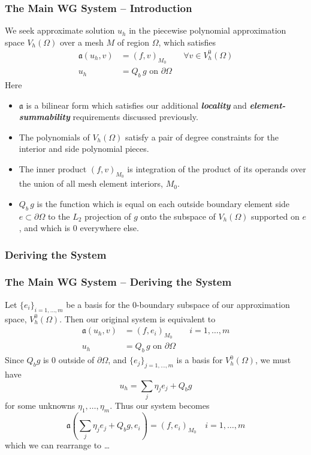 \documentclass[compress]{beamer}
\begin{document}
\begin{frame}
  \frametitle{The Main WG System -- Introduction}
    We seek approximate solution $u_h$ in the piecewise polynomial approximation space $V_h(\Omega)$ over a mesh $M$ 
    of region $\Omega$, which satisfies
    \begin{align*}
      \mathfrak{a}(u_h,v) & = (f,v)_{M_0}\quad\quad \forall{v} \in V_h^0(\Omega) \\
      u_h & = Q_b\,g \text{ on } \partial\Omega
    \end{align*}
    Here 
    \begin{itemize}[<+->]
      \item $\mathfrak{a}$ is a bilinear form which satisfies our additional \emph{\textbf{locality}} and
        \emph{\textbf{element-summability}} requirements discussed previously.
      \item The polynomials of $V_h(\Omega)$ satisfy a pair of degree constraints for the interior and side polynomial pieces. 
      \item The inner product $(f,v)_{M_0}$ is integration of the product of its operands over the union of all mesh element
        interiors, $M_0$.
      \item $Q_b\,g$ is the function which is equal on each outside boundary element side $e \subset \partial\Omega$ to the 
        $L_2$ projection of $g$ onto the subspace of $V_h(\Omega)$ supported on $e$, and which is $0$ everywhere else.
    \end{itemize}
\end{frame}
    
\subsubsection{Deriving the System}

\begin{frame}
  \frametitle{The Main WG System -- Deriving the System}
  Let $\{e_i\}_{i=1,\dots,m}$ be a basis for the 0-boundary subspace of our approximation space, $V_h^0(\Omega)$.
  Then our original system is equivalent to
  \begin{align*}
    \mathfrak{a}(u_h,v) & = (f,e_i)_{M_0}\quad\quad i=1,\dots,m \\
    u_h & = Q_b\,g \text{ on } \partial\Omega
  \end{align*}
  \pause
  Since $Q_b g$ is $0$ outside of $\partial \Omega$, and $\{e_j\}_{j=1,\dots,m}$ is a basis for $V_h^0(\Omega)$, we must have
  $$u_h = \sum_j{\eta_j e_j} + Q_b g$$
  for some unknowns $\eta_1,\dots,\eta_m.$  
  \pause
  Thus our system becomes
  $$\mathfrak{a}(\sum_j{\eta_j e_j} + Q_b g, e_i) = (f, e_i)_{M_0} \quad i=1,\dots,m$$
  which we can rearrange to \dots
\end{frame}
\end{document}
